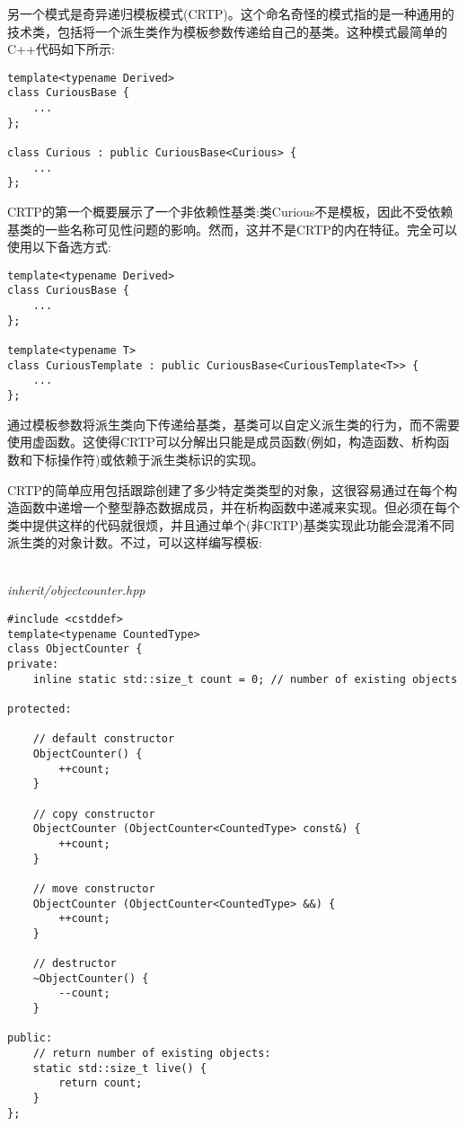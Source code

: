 
另一个模式是奇异递归模板模式(CRTP)。这个命名奇怪的模式指的是一种通用的技术类，包括将一个派生类作为模板参数传递给自己的基类。这种模式最简单的C++代码如下所示:

\begin{lstlisting}[style=styleCXX]
template<typename Derived>
class CuriousBase {
	...
};

class Curious : public CuriousBase<Curious> {
	...
};
\end{lstlisting}

CRTP的第一个概要展示了一个非依赖性基类:类Curious不是模板，因此不受依赖基类的一些名称可见性问题的影响。然而，这并不是CRTP的内在特征。完全可以使用以下备选方式:

\begin{lstlisting}[style=styleCXX]
template<typename Derived>
class CuriousBase {
	...
};

template<typename T>
class CuriousTemplate : public CuriousBase<CuriousTemplate<T>> {
	...
};
\end{lstlisting}

通过模板参数将派生类向下传递给基类，基类可以自定义派生类的行为，而不需要使用虚函数。这使得CRTP可以分解出只能是成员函数(例如，构造函数、析构函数和下标操作符)或依赖于派生类标识的实现。

CRTP的简单应用包括跟踪创建了多少特定类类型的对象，这很容易通过在每个构造函数中递增一个整型静态数据成员，并在析构函数中递减来实现。但必须在每个类中提供这样的代码就很烦，并且通过单个(非CRTP)基类实现此功能会混淆不同派生类的对象计数。不过，可以这样编写模板:

\hspace*{\fill} \\ %
\noindent
\textit{inherit/objectcounter.hpp}
\begin{lstlisting}[style=styleCXX]
#include <cstddef>
template<typename CountedType>
class ObjectCounter {
private:
	inline static std::size_t count = 0; // number of existing objects

protected:
	
	// default constructor
	ObjectCounter() {
		++count;
	}

	// copy constructor
	ObjectCounter (ObjectCounter<CountedType> const&) {
		++count;
	}

	// move constructor
	ObjectCounter (ObjectCounter<CountedType> &&) {
		++count;
	}

	// destructor
	~ObjectCounter() {
		--count;
	}

public:
	// return number of existing objects:
	static std::size_t live() {
		return count;
	}
};
\end{lstlisting}

